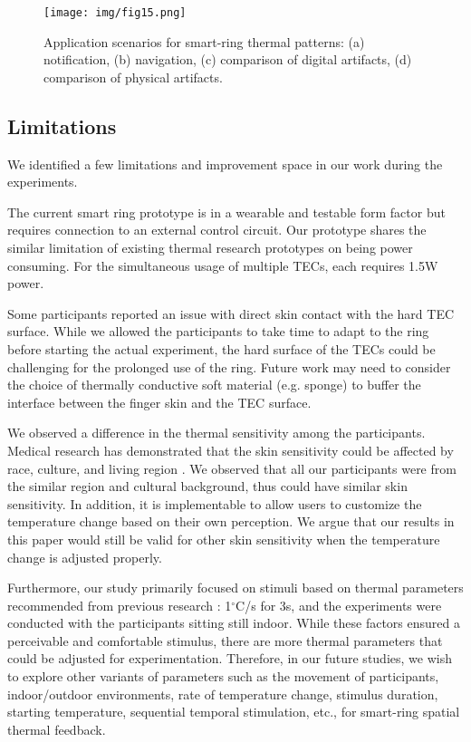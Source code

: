 \documentclass[preprint,12pt]{elsarticle}
\begin{document}
\begin{figure}[tp]
  \centering
  \texttt{[image: img/fig15.png]}
  \caption{Application scenarios for smart-ring thermal patterns: (a) notification, (b) navigation, (c) comparison of digital artifacts, (d) comparison of physical artifacts.}
  \label{fig:15}
\end{figure}

\subsection{Limitations}
We identified a few limitations and improvement space in our work during the experiments.

The current smart ring prototype is in a wearable and testable form factor but requires connection to an external control circuit. Our prototype shares the similar limitation of existing thermal research prototypes on being power consuming. For the simultaneous usage of multiple TECs, each requires 1.5W power.

Some participants reported an issue with direct skin contact with the hard TEC surface. While we allowed the participants to take time to adapt to the ring before starting the actual experiment, the hard surface of the TECs could be challenging for the prolonged use of the ring. Future work may need to consider the choice of thermally conductive soft material (e.g. sponge) to buffer the interface between the finger skin and the TEC surface.

We observed a difference in the thermal sensitivity among the participants. Medical research has demonstrated that the skin sensitivity could be affected by race, culture, and living region \cite{17}. We observed that all our participants were from the similar region and cultural background, thus could have similar skin sensitivity. In addition, it is implementable to allow users to customize the temperature change based on their own perception. We argue that our results in this paper would still be valid for other skin sensitivity when the temperature change is adjusted properly.

Furthermore, our study primarily focused on stimuli based on thermal parameters recommended from previous research \cite{42}: 1$^{\circ}$C/s for 3s, and the experiments were conducted with the participants sitting still indoor. While these factors ensured a perceivable and comfortable stimulus, there are more thermal parameters that could be adjusted for experimentation. Therefore, in our future studies, we wish to explore other variants of parameters such as the movement of participants, indoor/outdoor environments, rate of temperature change, stimulus duration, starting temperature, sequential temporal stimulation, etc., for smart-ring spatial thermal feedback.
\end{document}
